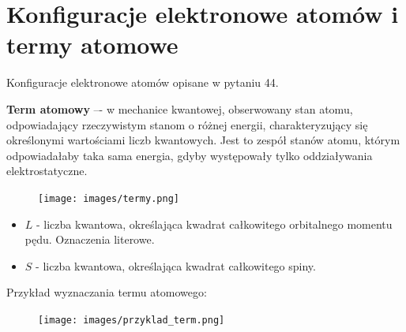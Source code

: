 \documentclass{article}
\begin{document}
\newpage
\section{Konfiguracje elektronowe atomów i termy atomowe}
Konfiguracje elektronowe atomów opisane w pytaniu 44.

\textbf{Term atomowy} –- w mechanice kwantowej, obserwowany stan atomu, odpowiadający rzeczywistym stanom o różnej energii, charakteryzujący się określonymi wartościami liczb kwantowych. 
Jest to zespół stanów atomu, którym odpowiadałaby taka sama energia, gdyby występowały tylko oddziaływania elektrostatyczne.
\begin{figure}[H]
    \centering
    \texttt{[image: images/termy.png]}
\end{figure}
\begin{itemize}
    \item $L$ - liczba kwantowa, określająca kwadrat całkowitego orbitalnego momentu pędu. Oznaczenia literowe.
    \item $S$ - liczba kwantowa, określająca kwadrat całkowitego spiny.
\end{itemize}

Przykład wyznaczania termu atomowego:
\begin{figure}[H]
    \centering
    \texttt{[image: images/przyklad\_term.png]}
\end{figure}
\end{document}
